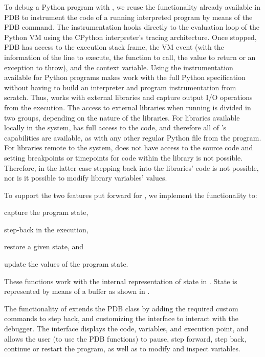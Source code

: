 To debug a Python program with \flik, we reuse the functionality already available in \ac{PDB} to 
instrument the code of a running interpreted program by means of the  \ac{PDB} 
command. The instrumentation hooks directly to the evaluation loop of the Python VM using the 
CPython interpreter's tracing architecture. Once stopped, \ac{PDB} has access to the execution stack 
frame, the VM event (with the information of the line to execute, the function to call, the value to 
return or an exception to throw), and the  context variable. Using the instrumentation 
available for Python programs makes \flik work with the full Python specification without having to 
build an interpreter and program instrumentation from scratch. 
Thus, \flik works with external libraries and capture 
output I/O operations from the execution. The access to external libraries when running \flik is divided 
in two groups, depending on the nature of the libraries. For libraries available locally in the system, 
\flik has full access to the code, and therefore all of \flik's capabilities are available, as with any other 
regular Python file from the program. For libraries remote to the system, \flik does not have access to 
the source code and setting breakpoints or timepoints for code within the library is not possible. 
Therefore, in the latter case stepping back into the libraries' code is not possible, nor is it possible to 
modify library variables' values.

To support the two features put forward for \flik, we implement the functionality to: 
\begin{enumerate*}[label=(\arabic*)]
\item capture the program state, 
\item step-back in the execution, 
\item restore a given state, and 
\item update the values of the program state.
\end{enumerate*}
These functions work with the internal representation of state in \flik. State is represented by means 
of a buffer as shown in .

The functionality of \flik extends the \ac{PDB} class by adding the required custom commands to 
step back, and customizing the interface to interact with the debugger. The interface 
displays the code, variables, and execution point, and allows the user (to use the \ac{PDB} 
functions) to pause, step forward, step back, continue or restart the program, as well as to 
modify and inspect variables. 

